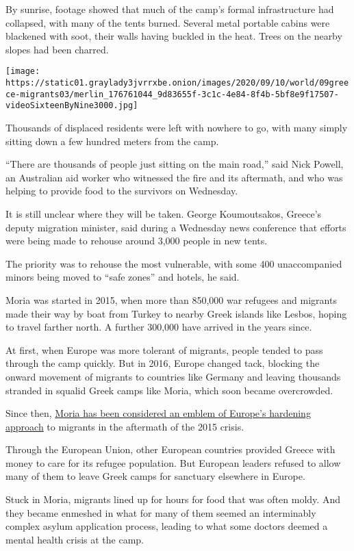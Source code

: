 By sunrise, footage showed that much of the camp's formal infrastructure
had collapsed, with many of the tents burned. Several metal portable
cabins were blackened with soot, their walls having buckled in the heat.
Trees on the nearby slopes had been charred.

\texttt{[image: https://static01.graylady3jvrrxbe.onion/images/2020/09/10/world/09greece-migrants03/merlin\_176761044\_9d83655f-3c1c-4e84-8f4b-5bf8e9f17507-videoSixteenByNine3000.jpg]}

Thousands of displaced residents were left with nowhere to go, with many
simply sitting down a few hundred meters from the camp.

``There are thousands of people just sitting on the main road,'' said
Nick Powell, an Australian aid worker who witnessed the fire and its
aftermath, and who was helping to provide food to the survivors on
Wednesday.

It is still unclear where they will be taken. George Koumoutsakos,
Greece's deputy migration minister, said during a Wednesday news
conference that efforts were being made to rehouse around 3,000 people
in new tents.

The priority was to rehouse the most vulnerable, with some 400
unaccompanied minors being moved to ``safe zones'' and hotels, he said.

Moria was started in 2015, when more than 850,000 war refugees and
migrants made their way by boat from Turkey to nearby Greek islands like
Lesbos, hoping to travel farther north. A further 300,000 have arrived
in the years since.

At first, when Europe was more tolerant of migrants, people tended to
pass through the camp quickly. But in 2016, Europe changed tack,
blocking the onward movement of migrants to countries like Germany and
leaving thousands stranded in squalid Greek camps like Moria, which soon
became overcrowded.

Since then,
\href{https://www.nytimes3xbfgragh.onion/2018/10/02/world/europe/greece-lesbos-moria-refugees.html}{Moria
has been considered an emblem of Europe's hardening approach} to
migrants in the aftermath of the 2015 crisis.

Through the European Union, other European countries provided Greece
with money to care for its refugee population. But European leaders
refused to allow many of them to leave Greek camps for sanctuary
elsewhere in Europe.

Stuck in Moria, migrants lined up for hours for food that was often
moldy. And they became enmeshed in what for many of them seemed an
interminably complex asylum application process, leading to what some
doctors deemed a mental health crisis at the camp.

